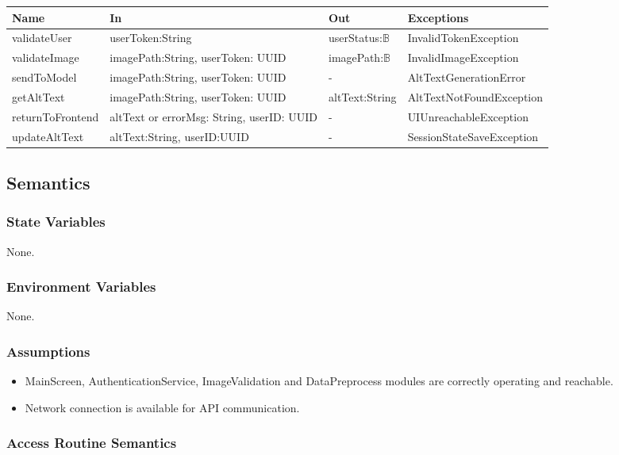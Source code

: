 \documentclass[12pt, titlepage]{article}
\newcommand{\Bool}{\ensuremath{\mathbb{B}}}
\begin{document}
\begin{center}
\begin{tabular}{p{3cm} p{6cm} p{3cm} p{3cm}}
\hline
\textbf{Name} & \textbf{In} & \textbf{Out} & \textbf{Exceptions} \\
\hline
validateUser & userToken:String & userStatus:\Bool & InvalidTokenException \\
\hline
validateImage & imagePath:String, userToken: UUID & imagePath:\Bool & InvalidImageException\\
\hline
sendToModel & imagePath:String, userToken: UUID & - & AltTextGenerationError\\
\hline 
getAltText & imagePath:String, userToken: UUID & altText:String & AltTextNotFoundException\\
\hline 
returnToFrontend & altText or errorMsg: String, userID: UUID & - & UIUnreachableException \\
\hline
updateAltText & altText:String, userID:UUID & - & SessionStateSaveException\\
\hline 
\end{tabular}
\end{center}

\subsection{Semantics}

\subsubsection{State Variables}
None.

\subsubsection{Environment Variables}
None. 

\subsubsection{Assumptions}

\begin{itemize}
  \item MainScreen, AuthenticationService, ImageValidation and DataPreprocess modules are correctly operating and reachable. 
  \item Network connection is available for API communication. 
\end{itemize}

\subsubsection{Access Routine Semantics}
\end{document}
